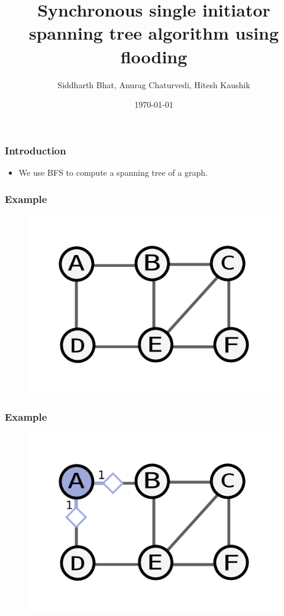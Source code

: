 \documentclass{beamer}
\title{Synchronous single initiator spanning tree algorithm using flooding}
\author{Siddharth Bhat, Anurag Chaturvedi, Hitesh Kaushik}
\date{\today}
\begin{document}
\begin{frame}
\titlepage
\end{frame}

\begin{frame}
    \frametitle{Introduction}
    \begin{itemize}
        \item We use BFS to compute a spanning tree of a graph.
    \end{itemize}
\end{frame}


\begin{frame}
    \frametitle{Example}
    \begin{figure}
    \includegraphics[width=0.5\paperwidth]{base.pdf}
    \end{figure}
\end{frame}

\begin{frame}
    \frametitle{Example}
    \begin{figure}
    \includegraphics[width=0.5\paperwidth]{round1.pdf}
    \end{figure}
\end{frame}
\end{document}
